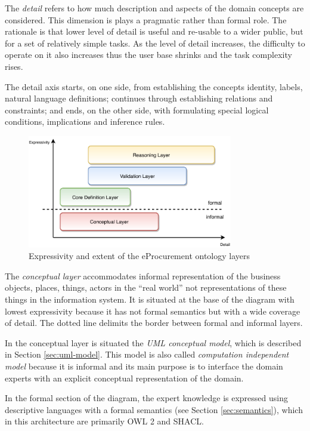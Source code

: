 	The \textit{detail} refers to how much description and aspects of the domain concepts are considered. This dimension is plays a pragmatic rather than formal role. The rationale is that lower level of detail is useful and re-usable to a wider public, but for a set of relatively simple tasks. As the level of detail increases, the difficulty to operate on it also increases thus the user base shrinks and the task complexity rises. 
	
	The detail axis starts, on one side, from establishing the concepts identity, labels, natural language  definitions; continues through establishing relations and constraints; and ends, on the other side, with formulating special logical conditions, implications and inference rules.
	
	\begin{figure}[!ht]
		\centering
		\includegraphics[width=0.8\textwidth]{../img/eProcurement-layers}
		\caption{Expressivity and extent of the eProcurement ontology layers}
		\label{fig:layers}
	\end{figure}
	
	The \textit{conceptual layer} accommodates informal representation of the business objects, places, things, actors in the ``real world'' not representations of these things in the information system. It is situated at the base of the diagram with lowest expressivity because it has not formal semantics but with a wide coverage of detail. The dotted line delimits the border between formal and informal layers.
	
	In the conceptual layer is situated the \textit{UML conceptual model}, which is described in Section \ref{sec:uml-model}. This model is also called \textit{computation independent model} because it is informal and its main purpose is to interface the domain experts with an explicit conceptual representation of the domain.
		
	In the formal section of the diagram, the expert knowledge is expressed using descriptive languages with a formal semantics (see Section \ref{sec:semantics}), which in this architecture are primarily OWL 2\cite{owl2} and SHACL\cite{shacl-spec}. 
		
